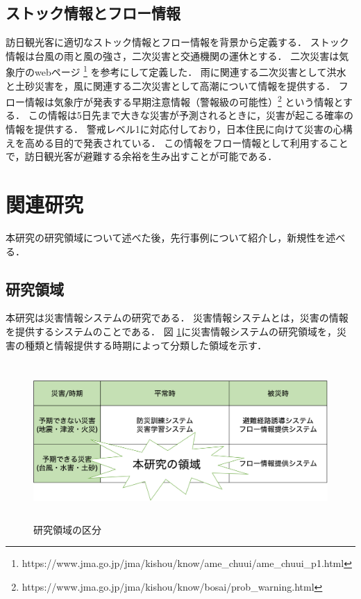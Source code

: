 \documentclass[a4paper,11pt,oneside,openany]{jsbook}
\begin{document}
\subsection{ストック情報とフロー情報}
訪日観光客に適切なストック情報とフロー情報を背景から定義する．
ストック情報は台風の雨と風の強さ，二次災害と交通機関の運休とする．
二次災害は気象庁のwebページ \footnote{https://www.jma.go.jp/jma/kishou/know/ame\_chuui/ame\_chuui\_p1.html} を参考にして定義した．
雨に関連する二次災害として洪水と土砂災害を，風に関連する二次災害として高潮について情報を提供する．
フロー情報は気象庁が発表する早期注意情報（警報級の可能性）\footnote{https://www.jma.go.jp/jma/kishou/know/bosai/prob\_warning.html} という情報とする．
この情報は5日先まで大きな災害が予測されるときに，災害が起こる確率の情報を提供する．
警戒レベル1に対応付しており，日本住民に向けて災害の心構えを高める目的で発表されている．
この情報をフロー情報として利用することで，訪日観光客が避難する余裕を生み出すことが可能である．

\section{関連研究}
本研究の研究領域について述べた後，先行事例について紹介し，新規性を述べる．

\subsection{研究領域}
本研究は災害情報システムの研究である．
災害情報システムとは，災害の情報を提供するシステムのことである．
図 \ref{fig:reasearch_area}に災害情報システムの研究領域を，災害の種類と情報提供する時期によって分類した領域を示す．

\begin{figure}[H]
  \centering
  \includegraphics[height=6cm]{./fig/research_area.png}
  \caption{研究領域の区分}
  \label{fig:reasearch_area}
\end{figure}
\end{document}

